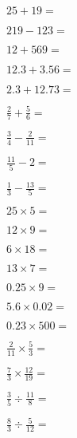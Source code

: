 \documentclass[10pt]{exam}
\begin{document}
\begin{questions}
\begin{multicols}{2}

\question
\( \displaystyle 25 + 19 =\)
\vspace*{0.5in}

\question
\( \displaystyle 219 - 123 =\)
\vspace*{0.5in}

\question
\( \displaystyle 12 + 569 =\)
\vspace*{0.5in}

\question
\( \displaystyle 12.3 + 3.56 =\)
\vspace*{0.5in}

\question
\( \displaystyle 2.3 + 12.73 =\)
\vspace*{0.5in}

\question
\( \displaystyle \frac{2}{7} + \frac{5}{6}=\)
\vspace*{0.5in}

\question
\( \displaystyle \frac{3}{4} - \frac{2}{11}=\)
\vspace*{0.5in}

\question
\( \displaystyle \frac{11}{5} - 2=\)
\vspace*{0.5in}

\question
\( \displaystyle \frac{1}{3} - \frac{13}{5}=\)
\vspace*{0.5in}

\question
\( \displaystyle 25 \times 5=\)
\vspace*{0.5in}

\question
\( \displaystyle 12 \times 9= \)
\vspace*{0.5in}

\question
\( \displaystyle 6 \times 18=\)
\vspace*{0.5in}

\question
\( \displaystyle 13 \times 7= \)
\vspace*{0.5in}

\question
\( \displaystyle 0.25 \times 9= \)
\vspace*{0.5in}

\question
\( \displaystyle 5.6 \times 0.02= \)
\vspace*{0.5in}

\question
\( \displaystyle 0.23 \times 500= \)
\vspace*{0.5in}

\question
\(\displaystyle \frac{2}{11} \times \frac{5}{3}=\)
\vspace*{0.5in}

\question
\(\displaystyle \frac{7}{3} \times \frac{12}{19}=\)
\vspace*{0.5in}

\question
\(\displaystyle \frac{3}{5} \div \frac{11}{8}=\)
\vspace*{0.5in}

\question
\(\displaystyle \frac{8}{3} \div \frac{5}{12}=\)
\vspace*{0.5in}

\end{multicols}
\end{questions}
\end{document}
